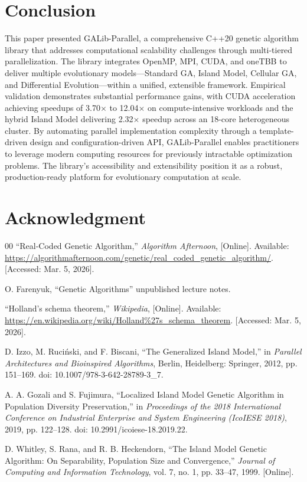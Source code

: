 \documentclass[conference]{IEEEtran}
\begin{document}
    \section{Conclusion}
    This paper presented GALib-Parallel, a comprehensive C++20 genetic algorithm library that addresses computational scalability challenges through multi-tiered parallelization. The library integrates OpenMP, MPI, CUDA, and oneTBB to deliver multiple evolutionary models---Standard GA, Island Model, Cellular GA, and Differential Evolution---within a unified, extensible framework. Empirical validation demonstrates substantial performance gains, with CUDA acceleration achieving speedups of 3.70$\times$ to 12.04$\times$ on compute-intensive workloads and the hybrid Island Model delivering 2.32$\times$ speedup across an 18-core heterogeneous cluster. By automating parallel implementation complexity through a template-driven design and configuration-driven API, GALib-Parallel enables practitioners to leverage modern computing resources for previously intractable optimization problems. The library's accessibility and extensibility position it as a robust, production-ready platform for evolutionary computation at scale.

    \section*{Acknowledgment}

    \begin{thebibliography}{00}
         ``Real-Coded Genetic Algorithm,'' \textit{Algorithm Afternoon}, [Online]. Available: \url{https://algorithmafternoon.com/genetic/real_coded_genetic_algorithm/}. [Accessed: Mar. 5, 2026].
        
         O. Farenyuk, ``Genetic Algorithms'' unpublished lecture notes.

         ``Holland's schema theorem,'' \textit{Wikipedia}, [Online]. Available: \url{https://en.wikipedia.org/wiki/Holland%27s_schema_theorem}. [Accessed: Mar. 5, 2026].

         D. Izzo, M. Ruci{\'n}ski, and F. Biscani, ``The Generalized Island Model,'' in \textit{Parallel Architectures and Bioinspired Algorithms}, Berlin, Heidelberg: Springer, 2012, pp. 151--169. doi: 10.1007/978-3-642-28789-3\_7.

         A. A. Gozali and S. Fujimura, ``Localized Island Model Genetic Algorithm in Population Diversity Preservation,'' in \textit{Proceedings of the 2018 International Conference on Industrial Enterprise and System Engineering (IcoIESE 2018)}, 2019, pp. 122--128. doi: 10.2991/icoiese-18.2019.22.

         D. Whitley, S. Rana, and R. B. Heckendorn, ``The Island Model Genetic Algorithm: On Separability, Population Size and Convergence,'' \textit{Journal of Computing and Information Technology}, vol. 7, no. 1, pp. 33--47, 1999. [Online].
    \end{thebibliography}
\end{document}
